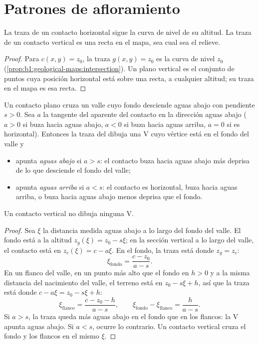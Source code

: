 \section{Patrones de afloramiento}

\begin{proposition}\label{prop:b1:geological-maps:hv}
La traza de un contacto horizontal sigue la curva de nivel de su altitud. La traza de un contacto
vertical es una recta en el mapa, sea cual sea el relieve.
\end{proposition}

\begin{proof}
Para $c(x,y) = z_0$, la traza $g(x,y) = z_0$ es la curva de nivel $z_0$
(\cref{prop:b1:geological-maps:intersection}). Un plano vertical es el conjunto de puntos cuya
posición horizontal está sobre una recta, a cualquier altitud; su traza en el mapa es esa recta.
\end{proof}

\begin{theorem}[La regla de la V]\label{thm:b1:geological-maps:v-rule}
Un contacto plano cruza un valle cuyo fondo desciende aguas abajo con pendiente $s > 0$. Sea $a$ la
tangente del  aparente del contacto en la dirección aguas abajo ($a > 0$ si buza hacia
aguas abajo, $a < 0$ si buza hacia aguas arriba, $a = 0$ si es horizontal). Entonces la traza del
 dibuja una V cuyo vértice está en el fondo del valle y
\begin{itemize}
  \item apunta \emph{aguas abajo} si $a > s$: el contacto buza hacia aguas abajo más deprisa de lo
        que desciende el fondo del valle;
  \item apunta \emph{aguas arriba} si $a < s$: el contacto es horizontal, buza hacia aguas arriba,
        o buza hacia aguas abajo menos deprisa que el fondo.
\end{itemize}
Un contacto vertical no dibuja ninguna V.
\end{theorem}

\begin{proof}
Sea $\xi$ la distancia medida aguas abajo a lo largo del fondo del valle. El fondo está a la
altitud $z_g(\xi) = z_0 - s\xi$; en la sección vertical a lo largo del valle, el contacto está en
$z_c(\xi) = c - a\xi$. En el fondo, la traza está donde $z_g = z_c$:
\[
  \xi_{\text{fondo}} = \frac{c - z_0}{a - s}.
\]
En un flanco del valle, en un punto más alto que el fondo en $h > 0$ y a la misma distancia del
nacimiento del valle, el terreno está en $z_0 - s\xi + h$, así que la traza está donde
$c - a\xi = z_0 - s\xi + h$:
\[
  \xi_{\text{flanco}} = \frac{c - z_0 - h}{a - s}, \qquad
  \xi_{\text{fondo}} - \xi_{\text{flanco}} = \frac{h}{a - s}.
\]
Si $a > s$, la traza queda más aguas abajo en el fondo que en los flancos: la V apunta aguas
abajo. Si $a < s$, ocurre lo contrario. Un contacto vertical cruza el fondo y los flancos en el
mismo $\xi$.
\end{proof}

